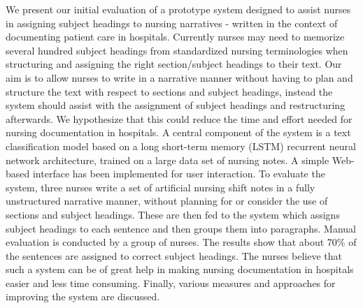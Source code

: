 We present our initial evaluation of a prototype system designed to assist nurses in assigning subject headings to nursing narratives - written in the context of documenting patient care in hospitals. Currently nurses may need to memorize several hundred subject headings from standardized nursing terminologies when structuring and assigning the right section/subject headings to their text. Our aim is to allow nurses to write in a narrative manner without having to plan and structure the text with respect to sections and subject headings, instead the system should assist with the assignment of subject headings and restructuring afterwards. We hypothesize that this could reduce the time and effort needed for nursing documentation in hospitals. A central component of the system is a text classification model based on a long short-term memory (LSTM) recurrent neural network architecture, trained on a large data set of nursing notes. A simple Web-based interface has been implemented for user interaction. To evaluate the system, three nurses write a set of artificial nursing shift notes in a fully unstructured narrative manner, without planning for or consider the use of sections and subject headings. These are then fed to the system which assigns subject headings to each sentence and then groups them into paragraphs. Manual evaluation is conducted by a group of nurses. The results show that about 70\% of the sentences are assigned to correct subject headings. The nurses believe that such a system can be of great help in making nursing documentation in hospitals easier and less time consuming. Finally, various measures and approaches for improving the system are discussed.
